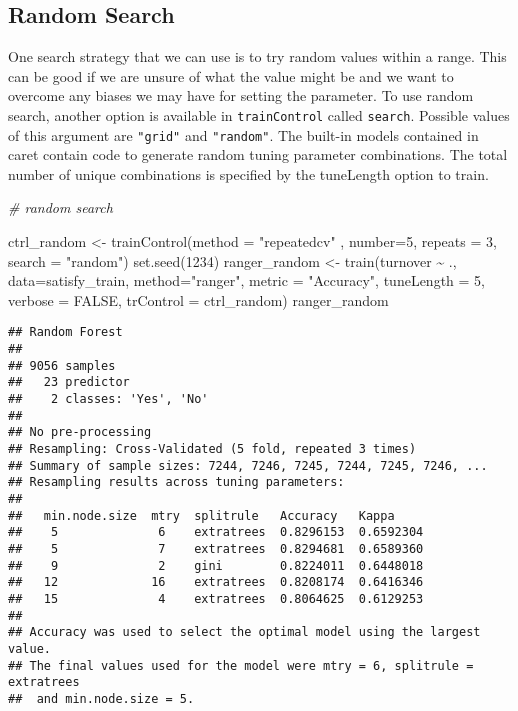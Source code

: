 \documentclass[
]{book}
\newenvironment{Shaded}{\begin{snugshade}}{\end{snugshade}}
\newcommand{\AttributeTok}[1]{\textcolor[rgb]{0.77,0.63,0.00}{#1}}
\newcommand{\CommentTok}[1]{\textcolor[rgb]{0.56,0.35,0.01}{\textit{#1}}}
\newcommand{\ConstantTok}[1]{\textcolor[rgb]{0.00,0.00,0.00}{#1}}
\newcommand{\DecValTok}[1]{\textcolor[rgb]{0.00,0.00,0.81}{#1}}
\newcommand{\FunctionTok}[1]{\textcolor[rgb]{0.00,0.00,0.00}{#1}}
\newcommand{\NormalTok}[1]{#1}
\newcommand{\OtherTok}[1]{\textcolor[rgb]{0.56,0.35,0.01}{#1}}
\newcommand{\SpecialCharTok}[1]{\textcolor[rgb]{0.00,0.00,0.00}{#1}}
\newcommand{\StringTok}[1]{\textcolor[rgb]{0.31,0.60,0.02}{#1}}
\begin{document}
\hypertarget{random-search-1}{%
\subsection{Random Search}\label{random-search-1}}

One search strategy that we can use is to try random values within a range. This can be good if we are unsure of what the value might be and we want to overcome any biases we may have for setting the parameter.
To use random search, another option is available in \texttt{trainControl} called \texttt{search}. Possible values of this argument are \texttt{"grid"} and \texttt{"random"}. The built-in models contained in caret contain code to generate random tuning parameter combinations. The total number of unique combinations is specified by the tuneLength option to train.

\begin{Shaded}
\begin{Highlighting}[]
\CommentTok{\# random search}

\NormalTok{ctrl\_random }\OtherTok{\textless{}{-}} \FunctionTok{trainControl}\NormalTok{(}\AttributeTok{method =} \StringTok{"repeatedcv"}\NormalTok{ , }\AttributeTok{number=}\DecValTok{5}\NormalTok{, }
                            \AttributeTok{repeats =} \DecValTok{3}\NormalTok{, }
                           \AttributeTok{search =} \StringTok{"random"}\NormalTok{)}
\FunctionTok{set.seed}\NormalTok{(}\DecValTok{1234}\NormalTok{)}
\NormalTok{ranger\_random }\OtherTok{\textless{}{-}} \FunctionTok{train}\NormalTok{(turnover }\SpecialCharTok{\textasciitilde{}}\NormalTok{ ., }\AttributeTok{data=}\NormalTok{satisfy\_train, }\AttributeTok{method=}\StringTok{"ranger"}\NormalTok{, }
                  \AttributeTok{metric =} \StringTok{"Accuracy"}\NormalTok{, }
                  \AttributeTok{tuneLength =} \DecValTok{5}\NormalTok{, }\AttributeTok{verbose =} \ConstantTok{FALSE}\NormalTok{,}
                  \AttributeTok{trControl =}\NormalTok{ ctrl\_random)}
\NormalTok{ranger\_random}
\end{Highlighting}
\end{Shaded}

\begin{verbatim}
## Random Forest 
## 
## 9056 samples
##   23 predictor
##    2 classes: 'Yes', 'No' 
## 
## No pre-processing
## Resampling: Cross-Validated (5 fold, repeated 3 times) 
## Summary of sample sizes: 7244, 7246, 7245, 7244, 7245, 7246, ... 
## Resampling results across tuning parameters:
## 
##   min.node.size  mtry  splitrule   Accuracy   Kappa    
##    5              6    extratrees  0.8296153  0.6592304
##    5              7    extratrees  0.8294681  0.6589360
##    9              2    gini        0.8224011  0.6448018
##   12             16    extratrees  0.8208174  0.6416346
##   15              4    extratrees  0.8064625  0.6129253
## 
## Accuracy was used to select the optimal model using the largest value.
## The final values used for the model were mtry = 6, splitrule = extratrees
##  and min.node.size = 5.
\end{verbatim}
\end{document}
